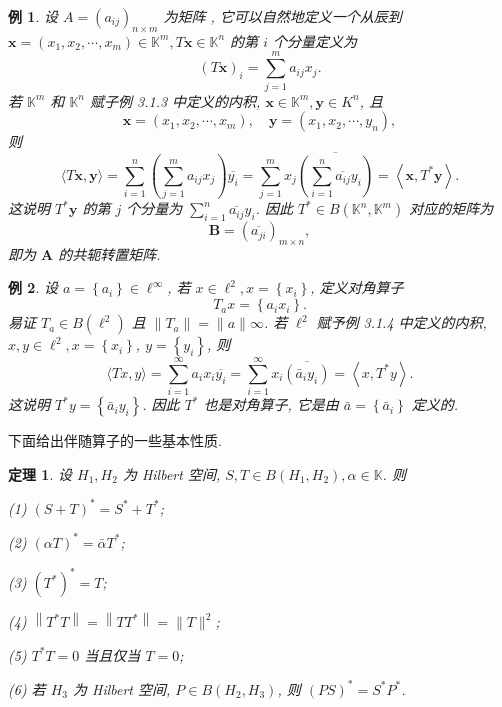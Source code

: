 \documentclass[openany]{ctexbook}
\theoremstyle{kaiti}
\newtheorem{theorem}{定理}[section]
\theoremstyle{normal}
\newtheorem{example}{例}[section]
\begin{document}
\begin{example}
设 $A=\left(a_{i j}\right)_{n \times m}$ 为矩阵 , 它可以自然地定义一个从辰到 $\boldsymbol{x}=\left(x_1, x_2, \cdots, x_m\right) \in \mathbb{K}^m, T \boldsymbol{x} \in \mathbb{K}^n$ 的第 $i$ 个分量定义为
$$
(T \boldsymbol{x})_{i}=\sum_{j=1}^m a_{i j} x_{j}.
$$
若 $\mathbb{K}^m$ 和 $\mathbb{K}^n$ 赋子例 3.1.3 中定义的内积, $\boldsymbol{x} \in \mathbb{K}^m, \boldsymbol{y} \in K^n$, 且
$$
\boldsymbol{x}=\left(x_1, x_2, \cdots, x_m\right), \quad \boldsymbol{y}=\left(x_1, x_2, \cdots, y_n\right),
$$
则
$$
\langle T \boldsymbol{x}, \boldsymbol{y}\rangle=\sum_{i=1}^n\left(\sum_{j=1}^m a_{i j} x_{j}\right) \overline{y_{i}}=\sum_{j=1}^m x_{j} \overline{\left(\sum_{i=1}^n \overline{a_{i j}} y_{i}\right)}=\left\langle\boldsymbol{x}, T^{*} \boldsymbol{y}\right\rangle.
$$
这说明 $T^{*} \boldsymbol{y}$ 的第 $j$ 个分量为 $\sum_{i=1}^n \overline{a_{i j}} y_{i}$. 因此 $T^{*} \in B\left(\mathbb{K}^n, \mathbb{K}^m\right)$ 对应的矩阵为
$$
\boldsymbol{B}=\left(\overline{a_{j i}}\right)_{m \times n},
$$
即为 $\boldsymbol{A}$ 的共轭转置矩阵.
\end{example}

\begin{example}
设 $a=\left\{a_{i}\right\} \in \ell^{\infty}$, 若 $x \in \ell^2, x=\left\{x_{i}\right\}$, 定义对角算子
$$
T_{a} x=\left\{a_{i} x_{i}\right\}.
$$
易证 $T_{a} \in B\left(\ell^2\right)$ 且 $\left\|T_{a}\right\|=\|a\| \infty$. 若 $\ell^2$ 赋予例 3.1.4 中定义的内积, $x, y \in \ell^2, x=\left\{x_{i}\right\}$, $y=\left\{y_{i}\right\}$, 则
$$
\langle T x, y\rangle=\sum_{i=1}^{\infty} a_{i} x_{i} \overline{y_{i}}=\sum_{i=1}^{\infty} x_{i} \overline{\left(\bar{a}_{i} y_{i}\right)}=\left\langle x, T^{*} y\right\rangle.
$$
这说明 $T^{*} y=\left\{\bar{a}_{i} y_{i}\right\}$. 因此 $T^{*}$ 也是对角算子, 它是由 $\bar{a}=\left\{\bar{a}_{i}\right\}$ 定义的.
\end{example}

下面给出伴随算子的一些基本性质.

\begin{theorem}
设 $H_1, H_2$ 为 Hilbert 空间, $S, T \in B\left(H_1, H_2\right), \alpha \in \mathbb{K}$. 则

(1) $(S+T)^{*}=S^{*}+T^{*}$;

(2) $(\alpha T)^{*}=\bar{\alpha} T^{*}$;

(3) $\left(T^{*}\right)^{*}=T$;

(4) $\left\|T^{*} T\right\|=\left\|T T^{*}\right\|=\|T\|^2$;

(5) $T^{*} T=0$ 当且仅当 $T=0$;

(6) 若 $H_3$ 为 Hilbert 空间, $P \in B\left(H_2, H_3\right)$, 则 $(P S)^{*}=S^{*} P^{*}$.
\end{theorem}
\end{document}
